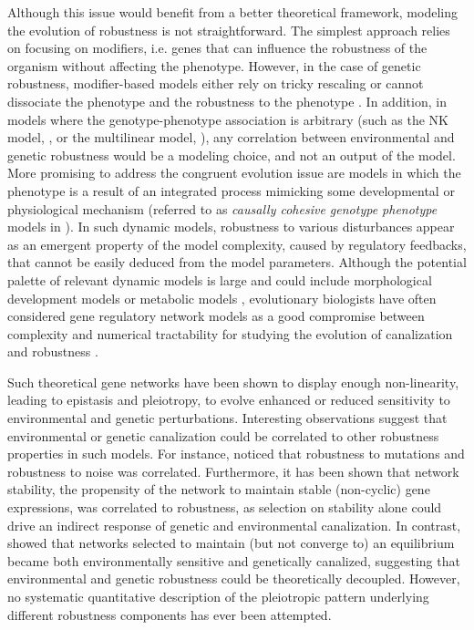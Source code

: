 \documentclass[10pt,a4paper]{article}
\begin{document}
Although this issue would benefit from a better theoretical framework, modeling the evolution of robustness is not straightforward. The simplest approach relies on focusing on modifiers, i.e. genes that can influence the robustness of the organism without affecting the phenotype. However, in the case of genetic robustness, modifier-based models either rely on tricky rescaling or cannot dissociate the phenotype and the robustness to the phenotype \citep{WBB97, Kaw00, RM13}. In addition, in models where the genotype-phenotype association is arbitrary (such as the NK model, \citealp{KL87}, or the multilinear model, \citealp{HW01}), any correlation between environmental and genetic robustness would be a modeling choice, and not an output of the model. More promising to address the congruent evolution issue are models in which the phenotype is a result of an integrated process mimicking some developmental or physiological mechanism (referred to as \emph{causally cohesive
genotype phenotype} models in \cite{RGV08}). In such dynamic models, robustness to various disturbances appear as an emergent property of the model complexity, caused by regulatory feedbacks, that cannot be easily deduced from the model parameters. Although the potential palette of relevant dynamic models is large and could include morphological development models \citep{MS20} or metabolic models \citep{NBR19}, evolutionary biologists have often considered gene regulatory network models as a good compromise between complexity and numerical tractability for studying the evolution of canalization and robustness \citep{Kau69,Wag94,SBB00,LP12}.

Such theoretical gene networks have been shown to display enough non-linearity, leading to epistasis and pleiotropy, to evolve enhanced or reduced sensitivity to environmental \citep{Mas04,EMW11,EMW11b} and genetic \citep{Wag96,BS03,DW08,ALS+06,RL16} perturbations. Interesting observations suggest that environmental or genetic canalization could be correlated to other robustness properties in such models. For instance, \citet{CMW07} noticed that robustness to mutations and robustness to noise was correlated. Furthermore, it has been shown that network stability, the propensity of the network to maintain stable (non-cyclic) gene expressions, was correlated to robustness, as selection on stability alone could drive an indirect response of genetic \citep{SB02} and environmental \citep{Mas04} canalization. In contrast, \citet{ORL18} showed that networks selected to maintain (but not converge to) an equilibrium became both environmentally sensitive and genetically canalized, suggesting that environmental and genetic robustness could be theoretically decoupled. However, no systematic quantitative description of the pleiotropic pattern underlying different robustness components has ever been attempted. 
\end{document}
